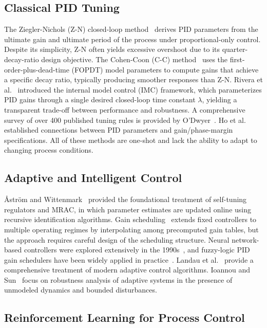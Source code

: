 \documentclass[conference,a4paper]{IEEEtran}[2015/08/26]
\begin{document}
\subsection{Classical PID Tuning}

The Ziegler-Nichols (Z-N) closed-loop method~\cite{Ziegler1942} derives
PID parameters from the ultimate gain and ultimate period of the
process under proportional-only control. Despite its simplicity, Z-N
often yields excessive overshoot due to its quarter-decay-ratio design
objective. The Cohen-Coon (C-C) method~\cite{Cohen1953} uses the
first-order-plus-dead-time (FOPDT) model parameters to compute gains
that achieve a specific decay ratio, typically producing smoother
responses than Z-N. Rivera et al.~\cite{Rivera1986} introduced the
internal model control (IMC) framework, which parameterizes PID gains
through a single desired closed-loop time constant $\lambda$, yielding a
transparent trade-off between performance and robustness. A comprehensive
survey of over 400 published tuning rules is provided by
O'Dwyer~\cite{ODwyer2006}. Ho et al.~\cite{Ho1995} established
connections between PID parameters and gain/phase-margin specifications.
All of these methods are one-shot and lack the ability to adapt to
changing process conditions.

\subsection{Adaptive and Intelligent Control}

{\AA}str{\"o}m and Wittenmark~\cite{Astrom2013} provided the
foundational treatment of self-tuning regulators and MRAC, in which
parameter estimates are updated online using recursive identification
algorithms. Gain scheduling~\cite{Rugh2000} extends fixed controllers
to multiple operating regimes by interpolating among precomputed
gain tables, but the approach requires careful design of the scheduling
structure. Neural network-based controllers were explored extensively
in the 1990s~\cite{Hunt1992}, and fuzzy-logic PID gain schedulers have
been widely applied in practice~\cite{Qin1993}. Landau et
al.~\cite{Landau2011} provide a comprehensive treatment of modern
adaptive control algorithms. Ioannou and Sun~\cite{Ioannou2012} focus
on robustness analysis of adaptive systems in the presence of
unmodeled dynamics and bounded disturbances.

\subsection{Reinforcement Learning for Process Control}
\end{document}
